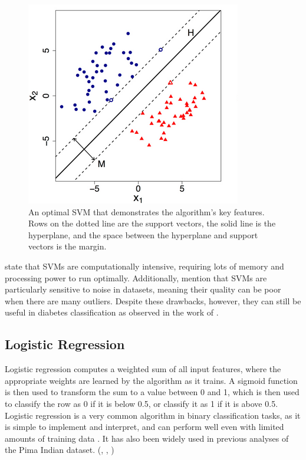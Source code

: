 \documentclass[12pt]{report}
\newcommand{\para}{\vspace{8pt}\noindent}
\begin{document}
\begin{figure}[H]
    \centering
    \includegraphics[width=.5\linewidth]{Algorithms/OptimalSVM.png}
    \caption{An optimal SVM that demonstrates the algorithm's key features. Rows on the dotted line are the support vectors, the solid line is the hyperplane, and the space
    between the hyperplane and support vectors is the margin. \autocite{kirchner_using_2018}}
    \label{fig:OptimalSVM}
\end{figure}

\para \textcite{kirchner_using_2018} state that SVMs are computationally intensive, requiring lots of memory and processing power 
to run optimally. Additionally, \textcite{atla_sensitivity_2011} mention that SVMs are particularly sensitive to noise in 
datasets, meaning their quality can be poor when there are many outliers. Despite these drawbacks, however, they can still 
be useful in diabetes classification as observed in the work of \textcite{zou_construction_2024}.

\subsection{Logistic Regression}
Logistic regression computes a weighted sum of all input features, where the appropriate weights are learned by the algorithm as it trains.
A sigmoid function is then used to transform the sum to a value between 0 and 1, which is then used to classify the row as 0 if it is below 
0.5, or classify it as 1 if it is above 0.5.
\para Logistic regression is a very common algorithm in binary classification tasks, as it is simple to implement and interpret, and
can perform well even with limited amounts of training data \autocite{kavya_applications_2024}. It has also been widely used in previous 
analyses of the Pima Indian dataset. (\textcite{alzubi_diabetes_2023}, \textcite{joshi_predicting_2021}, \textcite{zou_construction_2024})
\end{document}
